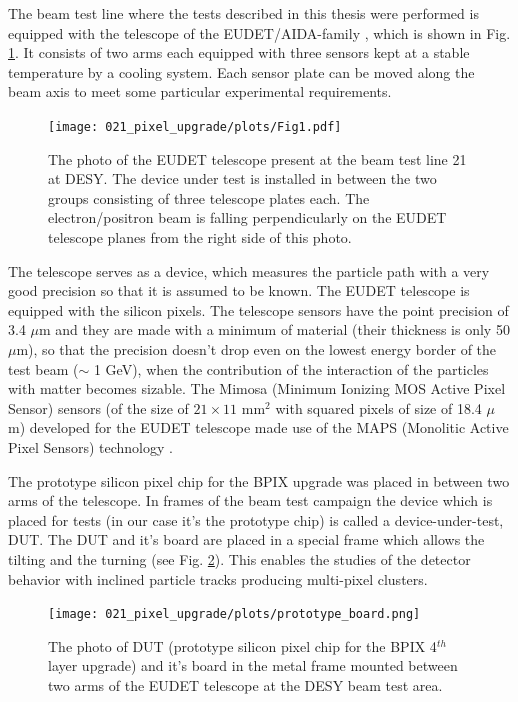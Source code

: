 The beam test line where the tests described in this thesis were performed is equipped with the telescope of the EUDET/AIDA-family \cite{EUDET},
which is shown in Fig. \ref{fig:EUDET_tel}. It consists of two arms each equipped with three sensors kept at a stable temperature by a cooling
system. Each sensor plate can be moved along the beam axis to meet some particular experimental requirements.

\begin{figure}[t]
 \centering
 \texttt{[image: 021\_pixel\_upgrade/plots/Fig1.pdf]}
 \caption{The photo of the EUDET telescope present at the beam test line 21 at DESY. The device under test is installed in between the two
 groups consisting of three telescope plates each. The electron/positron beam is falling perpendicularly on the EUDET telescope planes 
 from the right side of this photo.}
 \label{fig:EUDET_tel}
\end{figure}

The telescope serves as a device, which measures the particle path with a very good precision so that it is assumed to be known.
The EUDET telescope is equipped with the silicon pixels. The telescope sensors have the point precision of 3.4 $\mu$m and they
are made with a minimum of material (their thickness is only 50 $\mu$m), so that the precision doesn't drop even on the lowest 
energy border of the test beam ($\sim$ 1 GeV), when the contribution of the interaction of the particles with matter becomes 
sizable. The Mimosa (Minimum Ionizing MOS Active Pixel Sensor) sensors (of the size of $21 \times 11$ mm$^{2}$ with squared 
pixels of size of 18.4 $\mu$m) developed for the EUDET telescope made use of the MAPS (Monolitic Active Pixel Sensors) 
technology \cite{2001NIMPA.458..677T, Fischer:2002bv}.

The prototype silicon pixel chip for the BPIX upgrade was placed in between two arms of the telescope. In frames of the beam test 
campaign the device which is placed for tests (in our case it's the prototype chip) is called a device-under-test, DUT. The DUT
and it's board are placed in a special frame which allows the tilting and the turning (see Fig. \ref{fig:prototype_board}). 
This enables the studies of the detector behavior with inclined particle tracks producing multi-pixel clusters. 

\begin{figure}[t]
 \centering
 \texttt{[image: 021\_pixel\_upgrade/plots/prototype\_board.png]}
 \caption{The photo of DUT (prototype silicon pixel chip for the BPIX 4$^{th}$ layer upgrade) and it's board in the metal frame
 mounted between two arms of the EUDET telescope at the DESY beam test area.}
 \label{fig:prototype_board}
\end{figure}

